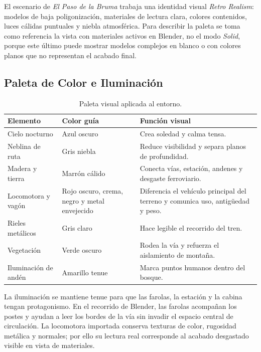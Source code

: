 ﻿\documentclass[11pt,letterpaper]{article}
\begin{document}
El escenario de \textit{El Paso de la Bruma} trabaja una identidad visual \textit{Retro Realism}: modelos de baja poligonización, materiales de lectura clara, colores contenidos, luces cálidas puntuales y niebla atmosférica. Para describir la paleta se toma como referencia la vista con materiales activos en Blender, no el modo \textit{Solid}, porque este último puede mostrar modelos complejos en blanco o con colores planos que no representan el acabado final.

\subsection{Paleta de Color e Iluminación}

\begin{table}[H]
\centering
\begin{tabularx}{\textwidth}{@{}L{4cm}L{3.4cm}Y@{}}
\toprule
\textbf{Elemento} & \textbf{Color guía} & \textbf{Función visual}\\
\midrule
Cielo nocturno & Azul oscuro & Crea soledad y calma tensa.\\
Neblina de ruta & Gris niebla & Reduce visibilidad y separa planos de profundidad.\\
Madera y tierra & Marrón cálido & Conecta vías, estación, andenes y desgaste ferroviario.\\
Locomotora y vagón & Rojo oscuro, crema, negro y metal envejecido & Diferencia el vehículo principal del terreno y comunica uso, antigüedad y peso.\\
Rieles metálicos & Gris claro & Hace legible el recorrido del tren.\\
Vegetación & Verde oscuro & Rodea la vía y refuerza el aislamiento de montaña.\\
Iluminación de andén & Amarillo tenue & Marca puntos humanos dentro del bosque.\\
\bottomrule
\end{tabularx}
\caption{Paleta visual aplicada al entorno.}
\end{table}

La iluminación se mantiene tenue para que las farolas, la estación y la cabina tengan protagonismo. En el recorrido de Blender, las farolas acompañan los postes y ayudan a leer los bordes de la vía sin invadir el espacio central de circulación. La locomotora importada conserva texturas de color, rugosidad metálica y normales; por ello su lectura real corresponde al acabado desgastado visible en vista de materiales.
\end{document}
